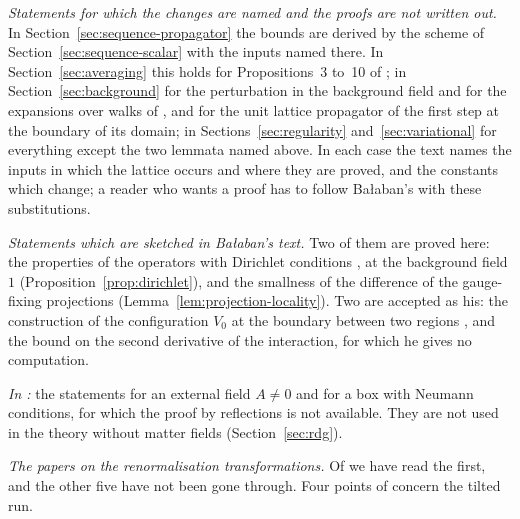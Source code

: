 \documentclass[11pt]{preprint}
\numberwithin{equation}{section}
\theoremstyle{definition}
\theoremstyle{remark}
\theoremstyle{plain}
\begin{document}
\emph{Statements for which the changes are named and the proofs are not written out.} In Section~\ref{sec:sequence-propagator} the bounds \cite[(2.136)--(2.140), (2.149), (2.151)]{BalabanPRT2} are derived by the scheme of Section~\ref{sec:sequence-scalar} with the inputs named there. In Section~\ref{sec:averaging} this holds for Propositions~3 to~10 of \cite{BalabanAVG}; in Section~\ref{sec:background} for the perturbation in the background field and for the expansions over walks of \cite[Sections~B and~C]{BalabanPBG}, and for the unit lattice propagator of the first step at the boundary of its domain; in Sections~\ref{sec:regularity} and~\ref{sec:variational} for everything except the two lemmata named above. In each case the text names the inputs in which the lattice occurs and where they are proved, and the constants which change; a reader who wants a proof has to follow Ba{\l}aban's with these substitutions.

\emph{Statements which are sketched in Ba{\l}aban's text.} Two of them are proved here: the properties of the operators with Dirichlet conditions \cite[p.~228]{BalabanPRT2}, at the background field $1$ (Proposition~\ref{prop:dirichlet}), and the smallness of the difference of the gauge-fixing projections \cite[(2.134)]{BalabanPRT2} (Lemma~\ref{lem:projection-locality}). Two are accepted as his: the construction of the configuration $V_0$ at the boundary between two regions \cite[p.~279]{BalabanVAR}, and the bound \cite[(189)]{BalabanVAR} on the second derivative of the interaction, for which he gives no computation.

\emph{In \cite{BalabanRDG}:} the statements for an external field $A \neq 0$ and for a box with Neumann conditions, for which the proof by reflections is not available. They are not used in the theory without matter fields (Section~\ref{sec:rdg}).

\emph{The papers on the renormalisation transformations.} Of \cite{BalabanRG1, BalabanRG2, BalabanCRE, BalabanLFR1, BalabanLFR2, BalabanUV3} we have read the first, and the other five have not been gone through. Four points of \cite{BalabanRG1} concern the tilted run.
\end{document}
